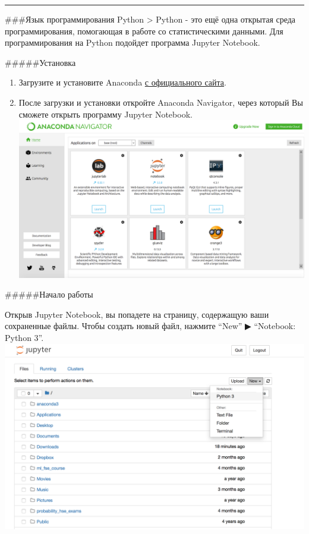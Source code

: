 \documentclass[]{book}
\begin{document}
\begin{center}\rule{0.5\linewidth}{\linethickness}\end{center}

\#\#\#Язык программирования Python
\textgreater{} Python - это ещё одна открытая среда программирования, помогающая в работе со статистическими данными. Для программирования на Python подойдет программа Jupyter Notebook.

\#\#\#\#\#Установка

\begin{enumerate}
\def\labelenumi{\arabic{enumi}.}
\item
  Загрузите и установите Anaconda \href{https://www.anaconda.com/distribution/}{с официального сайта}.
\item
  После загрузки и установки откройте Anaconda Navigator, через который Вы сможете открыть программу Jupyter Notebook.
  \includegraphics{images/Anaconda Navigator.png}
\end{enumerate}

\#\#\#\#\#Начало работы

Открыв Jupyter Notebook, вы попадете на страницу, содержащую ваши сохраненные файлы. Чтобы создать новый файл, нажмите ``New'' ▶ ``Notebook: Python 3''.
\includegraphics{images/New File in Jupyter.png}
\end{document}

